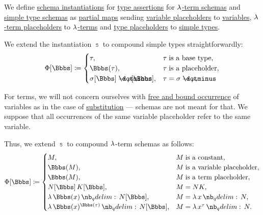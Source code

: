 \begin{definition}\label{def:lambda_schema_instantiation}
  We define \hyperref[con:schemas_and_instances]{schema instantiations} for \hyperref[def:type_assertion]{type assertions} for \hyperref[def:lambda_term_schema]{\( \mathrm{\lambda} \)-term schemas} and \hyperref[def:simple_type_schema]{simple type schemas} as \hyperref[def:set_valued_map/partial]{partial maps} sending \hyperref[def:lambda_term_schema]{variable placeholders} to \hyperref[def:lambda_term]{variables}, \hyperref[def:lambda_term_schema]{\( \mathrm{\lambda} \)-term placeholders} to \hyperref[def:lambda_term]{\( \mathrm{\lambda} \)-terms} and \hyperref[def:simple_type_schema]{type placeholders} to \hyperref[def:simple_type]{simple types}.

  \begin{thmenum}
     We extend the instantiation \( \Bbbs \) to compound simple types straightforwardly:
    \begin{equation}\label{eq:def:lambda_schema_instantiation/types}
      \Phi[\Bbbs] \coloneqq \begin{cases}
        \tau,                                  &\tau \T{is a base type},        \\
        \Bbbs(\tau),                           &\tau \T{is a placeholder},      \\
        \sigma[\Bbbs] \synimplies \rho[\Bbbs], &\tau = \sigma \synimplies \rho, \\
      \end{cases}
    \end{equation}

     For terms, we will not concern ourselves with \hyperref[def:lambda_variable_occurrence]{free and bound occurrence} of variables as in the case of \hyperref[def:lambda_term_substitution]{substitution} --- schemas are not meant for that. We suppose that all occurrences of the same variable placeholder refer to the same variable.

    Thus, we extend \( \Bbbs \) to compound \( \mathrm{\lambda} \)-term schemas as follows:
    \begin{equation}\label{eq:def:lambda_schema_instantiation/terms}
      \Phi[\Bbbs] \coloneqq \begin{cases}
        M,                                       &M \T{is a constant},             \\
        \Bbbs(M),                                &M \T{is a variable placeholder}, \\
        \Bbbs(M),                                &M \T{is a term placeholder},     \\
        N[\Bbbs] \thinspace K[\Bbbs],            &M = NK,                          \\
        \qabs {\Bbbs(x)} N[\Bbbs],               &M = \qabs x N,                   \\
        \qabs {\Bbbs(x)^{\Bbbs(\tau)}} N[\Bbbs], &M = \qabs {x^\tau} N.              \\
      \end{cases}
    \end{equation}


\end{thmenum}
\end{definition}
